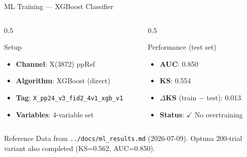 \documentclass[11pt,aspectratio=169]{beamer}
\begin{document}
\begin{frame}{ML Training — XGBoost Classifier}
  \begin{columns}[T]
    \begin{column}{0.5\textwidth}
      \begin{block}{Setup}
        \begin{itemize}
          \item \textbf{Channel}: X(3872) ppRef
          \item \textbf{Algorithm}: XGBoost (direct)
          \item \textbf{Tag}: \texttt{X\_pp24\_v3\_fid2\_4v1\_xgb\_v1}
          \item \textbf{Variables}: 4-variable set
        \end{itemize}
      \end{block}
    \end{column}
    \begin{column}{0.5\textwidth}
      \begin{block}{Performance (test set)}
        \begin{itemize}
          \item \textbf{AUC}: 0.850
          \item \textbf{KS}: 0.554
          \item \textbf{$\Delta$KS} (train $-$ test): 0.013
          \item \textbf{Status}: \textcolor{green!60!black}{$\checkmark$ No overtraining}
        \end{itemize}
      \end{block}
    \end{column}
  \end{columns}

  \vspace{0.5em}
  \begin{block}{Reference}
    Data from \texttt{../docs/ml\_results.md} (2026-07-09).
    Optuna 200-trial variant also completed (KS=0.562, AUC=0.850).
  \end{block}
\end{frame}
\end{document}
